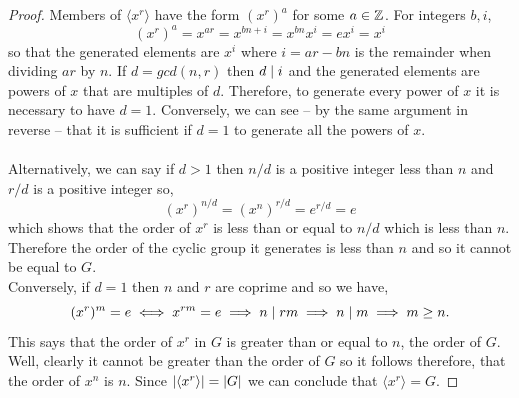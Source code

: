 \documentclass[MathsNotesBase.tex]{subfiles}
\begin{document}
{		
		\begin{proof}
			Members of ${ \langle x^r \rangle }$ have the form ${ (x^r)^a }$ for some ${ a \in \mathbb{Z}^{} }$. For integers ${ b,i }$,
			\[ (x^r)^a = x^{ar} = x^{bn + i} = x^{bn}x^i = ex^i = x^i \]
			so that the generated elements are ${ x^i }$ where ${ i = ar - bn }$ is the remainder when dividing $ar$ by $n$. If ${ d = gcd(n,r) }$ then ${ d \mid i }$ and the generated elements are powers of $x$ that are multiples of $d$. Therefore, to generate every power of $x$ it is necessary to have ${ d = 1 }$. Conversely, we can see -- by the same argument in reverse -- that it is sufficient if ${ d = 1 }$ to generate all the powers of $x$.\\\\
			Alternatively, we can say if ${ d > 1 }$ then ${ n/d }$ is a positive integer less than $n$ and ${ r/d }$ is a positive integer so,
			\[ (x^r)^{n/d} = (x^n)^{r/d} = e^{r/d} = e \]
			which shows that the order of $x^r$ is less than or equal to ${ n/d }$ which is less than $n$. Therefore the order of the cyclic group it generates is less than $n$ and so it cannot be equal to $G$.\\
			Conversely, if ${ d = 1 }$ then $n$ and $r$ are coprime and so we have,
			\[ (x^r)^m = e \iff x^{rm} = e \implies n \mid rm \implies n \mid m \implies m \geq n. \]
			This says that the order of ${ x^r }$ in $G$ is greater than or equal to $n$, the order of $G$. Well, clearly it cannot be greater than the order of $G$ so it follows therefore, that the order of $x^n$ is $n$. Since ${ \left\lvert\langle x^r \rangle\right\rvert = \left\lvert G\right\rvert }$ we can conclude that ${ \langle x^r \rangle = G }$.
		\end{proof}
	
}
\end{document}
